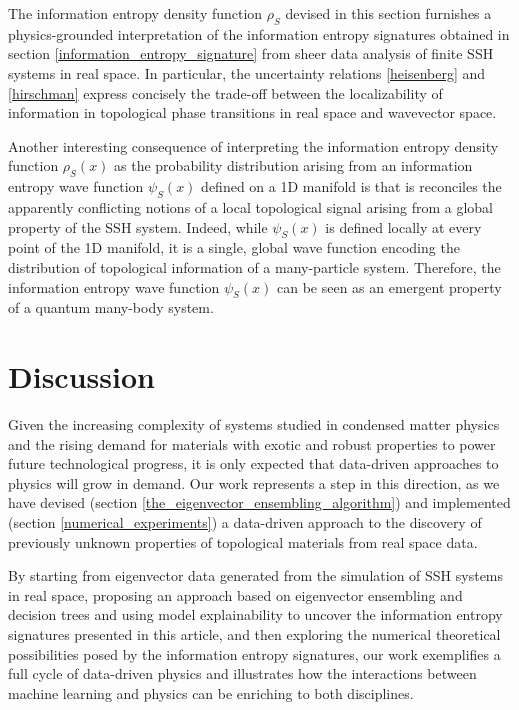 \documentclass[10pt]{revtex4-1}
\begin{document}
The information entropy density function $\rho_S$ devised in this section furnishes a physics-grounded interpretation of the information entropy signatures obtained in section \ref{information_entropy_signature} from sheer data analysis of finite SSH systems in real space. In particular, the uncertainty relations \eqref{heisenberg} and \eqref{hirschman} express concisely the trade-off between the localizability of information in topological phase transitions in real space and wavevector space. 

Another interesting consequence of interpreting the information entropy density function $\rho_S(x)$ as the probability distribution arising from an information entropy wave function $\psi_S(x)$ defined on a 1D manifold is that is reconciles the apparently conflicting notions of a local topological signal arising from a global property of the SSH system. Indeed, while $\psi_S(x)$ is defined locally at every point of the 1D manifold, it is a single, global wave function encoding the distribution of topological information of a many-particle system. Therefore, the information entropy wave function $\psi_S(x)$ can be seen as an emergent property of a quantum many-body system.    

\section{Discussion}
\label{discussion}

Given the increasing complexity of systems studied in condensed matter physics and the rising demand for materials with exotic and robust properties to power future technological progress, it is only expected that data-driven approaches to physics will grow in demand. Our work represents a step in this direction, as we have devised (section \ref{the_eigenvector_ensembling_algorithm}) and implemented (section \ref{numerical_experiments}) a data-driven approach to the discovery of previously unknown properties of topological materials from real space data.

By starting from eigenvector data generated from the simulation of SSH systems in real space, proposing an approach based on eigenvector ensembling and decision trees and using model explainability to uncover the information entropy signatures presented in this article, and then exploring the numerical theoretical possibilities posed by the information entropy signatures, our work exemplifies a full cycle of data-driven physics and illustrates how the interactions between machine learning and physics can be enriching to both disciplines.      
 
\end{document}
